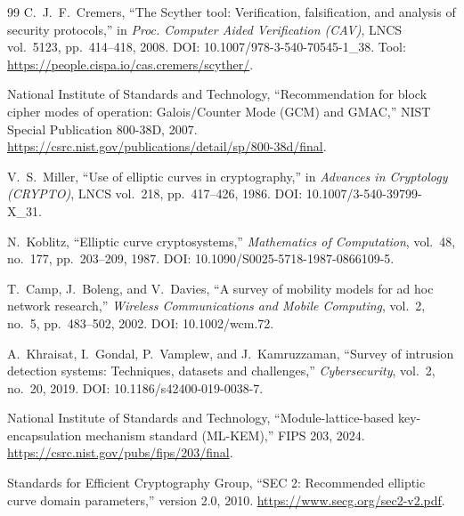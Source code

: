 \begin{thebibliography}{99}
C.~J.~F.~Cremers,
``The Scyther tool: Verification, falsification, and analysis of security protocols,''
in \emph{Proc. Computer Aided Verification (CAV)}, LNCS vol.~5123, pp.~414--418, 2008.
DOI: 10.1007/978-3-540-70545-1\_38.
Tool: \url{https://people.cispa.io/cas.cremers/scyther/}.

National Institute of Standards and Technology,
``Recommendation for block cipher modes of operation: Galois/Counter Mode (GCM) and GMAC,''
NIST Special Publication 800-38D, 2007.
\url{https://csrc.nist.gov/publications/detail/sp/800-38d/final}.

V.~S.~Miller,
``Use of elliptic curves in cryptography,''
in \emph{Advances in Cryptology (CRYPTO)}, LNCS vol.~218, pp.~417--426, 1986.
DOI: 10.1007/3-540-39799-X\_31.

N.~Koblitz,
``Elliptic curve cryptosystems,''
\emph{Mathematics of Computation}, vol.~48, no.~177, pp.~203--209, 1987.
DOI: 10.1090/S0025-5718-1987-0866109-5.

T.~Camp, J.~Boleng, and V.~Davies,
``A survey of mobility models for ad hoc network research,''
\emph{Wireless Communications and Mobile Computing}, vol.~2, no.~5, pp.~483--502, 2002.
DOI: 10.1002/wcm.72.

A.~Khraisat, I.~Gondal, P.~Vamplew, and J.~Kamruzzaman,
``Survey of intrusion detection systems: Techniques, datasets and challenges,''
\emph{Cybersecurity}, vol.~2, no.~20, 2019.
DOI: 10.1186/s42400-019-0038-7.

National Institute of Standards and Technology,
``Module-lattice-based key-encapsulation mechanism standard (ML-KEM),''
FIPS 203, 2024.
\url{https://csrc.nist.gov/pubs/fips/203/final}.

Standards for Efficient Cryptography Group,
``SEC 2: Recommended elliptic curve domain parameters,'' version 2.0, 2010.
\url{https://www.secg.org/sec2-v2.pdf}.

\end{thebibliography}
